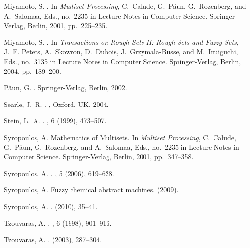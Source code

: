 \documentclass{amsart}
\theoremstyle{definition}
\begin{document}
\begin{thebibliography}{10}
{\sc Miyamoto, S.}
.
\newblock In {\em Multiset {P}rocessing}, C.~Calude, G.~P{\u{a}}un,
  G.~Rozenberg, and A.~Salomaa, Eds., no.~2235 in Lecture {N}otes in {C}omputer
  {S}cience. Springer-Verlag, Berlin, 2001, pp.~225--235.

{\sc Miyamoto, S.}
.
\newblock In {\em {Transactions on Rough Sets II: Rough Sets and Fuzzy Sets}},
  J.~F. Peters, A.~Skowron, D.~Dubois, J.~Grzymala-Busse, and M.~Inuiguchi,
  Eds., no.~3135 in Lecture {N}otes in {C}omputer {S}cience. Springer-Verlag,
  Berlin, 2004, pp.~189--200.

{\sc P{\u{a}}un, G.}
.
\newblock Springer-Verlag, Berlin, 2002.

{\sc Searle, J.~R.}
.
, Oxford, UK, 2004.

{\sc Stein, L.~A.}
.
, 6 (1999), 473--507.

{\sc Syropoulos, A.}
\newblock Mathematics of {Multisets}.
\newblock In {\em Multiset {P}rocessing}, C.~Calude, G.~P{\u{a}}un,
  G.~Rozenberg, and A.~Salomaa, Eds., no.~2235 in Lecture {N}otes in {C}omputer
  {S}cience. Springer-Verlag, Berlin, 2001, pp.~347--358.

{\sc Syropoulos, A.}
.
, 5 (2006), 619--628.

{\sc Syropoulos, A.}
\newblock Fuzzy chemical abstract machines.
 (2009).

{\sc Syropoulos, A.}
.
 (2010), 35--41.

{\sc Tzouvaras, A.}
.
, 6 (1998), 901--916.

{\sc Tzouvaras, A.}
.
 (2003), 287--304.


\end{thebibliography}
\end{document}
